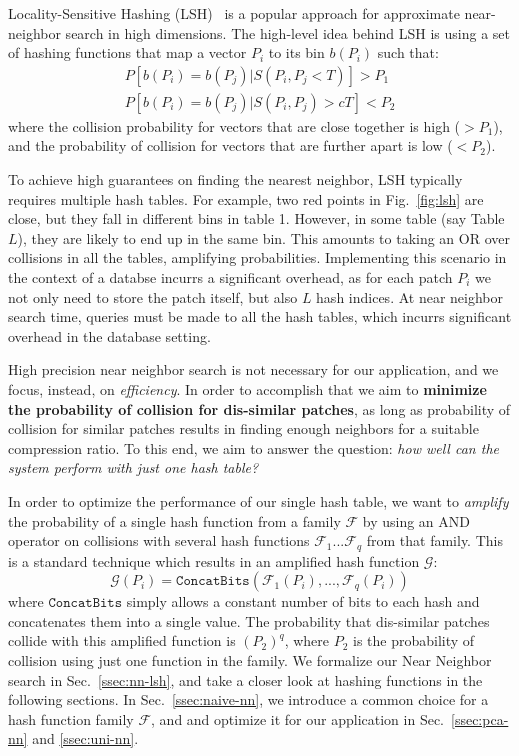 Locality-Sensitive Hashing (LSH)~\cite{LSH:Andoni}
is a popular approach for approximate near-neighbor search
in high dimensions. The high-level idea behind LSH is
using a set of hashing functions that map
a vector $P_i$ to its bin $b(P_i)$ such that:
\begin{equation*}
\begin{aligned}
P[b(P_i) = b(P_j) | S(P_i, P_j < T)] > P_1\\
P[b(P_i) = b(P_j) | S(P_i, P_j) > cT] < P_2
\end{aligned}
\end{equation*}
where the collision probability
for vectors that are close together is high
($> P_1$), and the probability of collision
for vectors that are further apart is low ($< P_2$).

To achieve high guarantees on finding the nearest
neighbor, LSH typically requires multiple hash tables.
For example, two red points in Fig.~\ref{fig:lsh} are close,
but they fall in different bins in table 1. However,
in some table (say Table $L$), they are likely to end up in
the same bin. This amounts to taking an OR over
collisions in all the tables, amplifying probabilities.
Implementing this scenario in the context
of a databse incurrs a significant overhead, as for each
patch $P_i$ we not only need to store the patch itself,
but also $L$ hash indices. At near neighbor search time,
queries must be made to all the hash tables, which incurrs significant
overhead in the database setting.

High precision near neighbor search is not necessary
for our application, and we focus, instead, on \emph{efficiency}.
In order to accomplish that we aim to \textbf{minimize the
probability of collision for dis-similar patches}, as long
as probability of collision for similar patches results in
finding enough neighbors for a suitable compression ratio.
To this end, we aim to answer the question:
\emph{how well can the system perform with just one hash table?}

In order to optimize the performance of our single hash table,
we want to \emph{amplify} the probability of a single hash
function from a family $\mathcal{F}$ by using an AND operator
on collisions with several hash functions
$\mathcal{F}_1...\mathcal{F}_q$ from that family.
This is a standard technique which results in an amplified
hash function $\mathcal{G}$:
\begin{equation}
\mathcal{G}(P_i) = \mathtt{ConcatBits}(\mathcal{F}_1(P_i),...,\mathcal{F}_q(P_i))
\end{equation}\label{eq:ampl}
where $\mathtt{ConcatBits}$ simply allows a constant
number of bits to each hash and concatenates them into a single value.
The probability that dis-similar patches collide with
this amplified function is $(P_2)^q$, where $P_2$ is the
probability of collision using just one function in the family.
We formalize our Near Neighbor search in Sec.~\ref{ssec:nn-lsh},
and take a closer look at hashing functions in the following sections.
In Sec.~\ref{ssec:naive-nn}, we introduce a common choice for a
 hash function family $\mathcal{F}$, and
and optimize it for our application in Sec.~\ref{ssec:pca-nn}
and \ref{ssec:uni-nn}.

